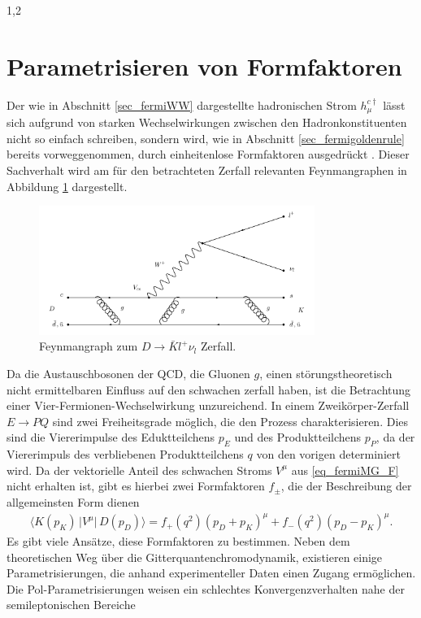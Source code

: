 \documentclass[11pt,a4paper,twoside]{report}
\begin{document}
\begin{spacing}{1,2}
\section{Parametrisieren von Formfaktoren}
\label{sec_paramForm}
Der wie in Abschnitt \ref{sec_fermiWW} dargestellte hadronischen Strom $h_\mu^{c\dagger}$ lässt sich aufgrund von starken Wechselwirkungen zwischen den 
Hadronkonstituenten nicht so einfach schreiben, sondern wird, wie in Abschnitt \ref{sec_fermigoldenrule} bereits vorweggenommen, durch einheitenlose Formfaktoren 
ausgedrückt \cite{KimPham}. Dieser Sachverhalt wird am für den betrachteten Zerfall relevanten Feynmangraphen in Abbildung \ref{pic_Dfeyn} dargestellt.
\begin{figure}[h]
\includegraphics[width=0.8\textwidth]{Abbildungen/DFeyn.png}
\caption{Feynmangraph zum $D\rightarrow \bar K l^+ \nu_l$ Zerfall.}
\label{pic_Dfeyn}
\end{figure}
\noindent
Da die Austauschbosonen der QCD, die Gluonen $g$, einen störungstheoretisch nicht ermittelbaren Einfluss auf den schwachen zerfall haben, ist die Betrachtung
einer Vier-Fermionen-Wechselwirkung unzureichend.
In einem Zweikörper-Zerfall $E\rightarrow PQ$ sind zwei Freiheitsgrade möglich, die den Prozess charakterisieren. Dies sind die Viererimpulse des Eduktteilchens
$p_E$ und des Produktteilchens $p_P$, da der Viererimpuls des verbliebenen Produktteilchens $q$ von den vorigen determiniert wird. Da der vektorielle 
Anteil des schwachen Stroms $V^\mu$ aus \eqref{eq_fermiMG_F} nicht erhalten ist, gibt es hierbei zwei Formfaktoren $f_\pm$, die der 
Beschreibung der allgemeinsten Form dienen
\begin{align}
 \big\langle K(p_K)\,\big|V^\mu\big|\, D(p_D)\big\rangle = f_+(q^2)(p_D+p_K)^\mu + f_-(q^2)(p_D-p_K)^\mu.
\end{align}
Es gibt viele Ansätze, diese Formfaktoren zu bestimmen. Neben dem theoretischen Weg über die Gitterquantenchromodynamik, existieren einige Parametrisierungen,
die anhand experimenteller Daten einen Zugang ermöglichen. Die Pol-Parametrisierungen weisen ein schlechtes Konvergenzverhalten nahe der semileptonischen Bereiche

\end{spacing}
\end{document}
